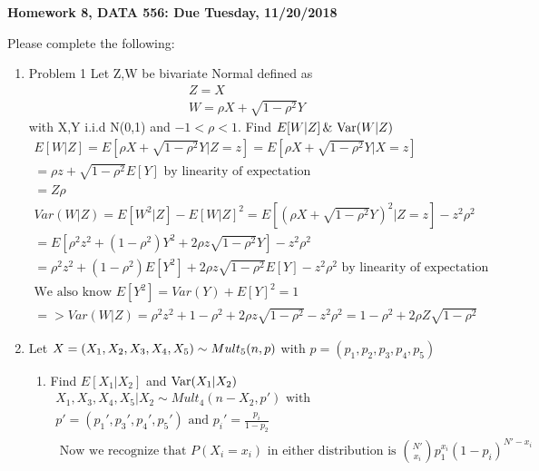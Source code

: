 \documentclass[11pt]{article}
\newcommand{\Var}{\mathop{\rm Var}}
\begin{document}
\begin{title}
	{\Large\bf Homework 8, DATA 556: Due Tuesday, 11/20/2018}
\end{title}

\author{\bf Alexander Van Roijen}

\maketitle

\newpage
Please complete the following:
\begin{enumerate}
\item Problem 1
	Let Z,W be bivariate Normal defined as
	\begin{gather}
	Z=X\\
	W=\rho X + \sqrt{1-\rho^2}Y
	\end{gather}
	with X,Y i.i.d N(0,1) and $-1<\rho<1$. Find $E[W|Z] \, \& \, \Var(W|Z)$
	\begin{gather}
	E[W|Z] = E[\rho X + \sqrt{1-\rho^2}Y|Z=z] = E[\rho X + \sqrt{1-\rho^2}Y|X=z]\\
	= \rho z + \sqrt{1-\rho^2}E[Y] \text{ by linearity of expectation}\\
	= Z\rho
	\\
	Var(W|Z) = E[W^2|Z]-E[W|Z]^2 = E[(\rho X + \sqrt{1-\rho^2}Y)^2|Z=z] - z^2 \rho^2\\ = E[\rho^2z^2 + (1-\rho^2)Y^2 + 2\rho z\sqrt{1-\rho^2}Y] - z^2\rho^2\\
	= \rho^2z^2 + (1-\rho^2)E[Y^2] + 2\rho z\sqrt{1-\rho^2}E[Y] - z^2\rho^2\text{ by linearity of expectation}\\
	\text{We also know }E[Y^2]=Var(Y)+E[Y]^2 = 1\\
	=>Var(W|Z) =  \rho^2z^2 + 1 - \rho^2 + 2\rho z\sqrt{1-\rho^2} - z^2\rho^2 = 1 - \rho^2 + 2\rho Z\sqrt{1-\rho^2}
	\end{gather}
\item Let $X = (X_1,X_2,X_3,X_4,X_5) \sim Mult_5(n,\boldmath{p})$ with $p = (p_1,p_2,p_3,p_4,p_5)$
\begin{enumerate}
	\item Find $E[X_1|X_2]$ and $\Var(X_1|X_2)$
	\begin{gather}
	X_1,X_3,X_4,X_5 | X_2 \sim Mult_4(n-X_2,p') \text{ with }\\
	p'=(p_1',p_3',p_4',p_5')\text{ and } p_i'= \frac{p_i}{1-p_2}\\
	\text{ Now we recognize that } P(X_i=x_i) \text{ in either distribution is }
	\binom{N'}{x_i}p_1^{x_i}(1-p_i)^{N'-x_i}\\

\end{gather}
\end{enumerate}
\end{enumerate}
\end{document}
